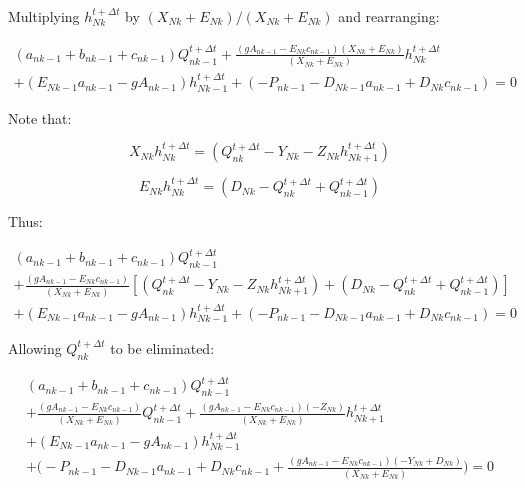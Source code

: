 \documentclass[11pt]{article}
\begin{document}
Multiplying $h_{Nk}^{t + \Delta t}$ by $(X_{Nk} + E_{Nk}) / (X_{Nk} + E_{Nk})$
and rearranging:

\begin{equation}
  \begin{split}
    (a_{nk - 1} + b_{nk - 1} + c_{nk - 1})  Q_{nk - 1}^{t + \Delta t} + \frac{( g A_{nk - 1} - E_{Nk} c_{nk - 1} ) (X_{Nk} + E_{Nk}) }{(X_{Nk} + E_{Nk})} h_{Nk}^{t + \Delta t} \\ + (E_{Nk - 1} a_{nk - 1} - g A_{nk -1}) h_{Nk - 1}^{t + \Delta t}   
    + ( - P_{nk - 1} - D_{Nk - 1} a_{nk - 1}   + D_{Nk} c_{nk - 1} ) = 0 
  \end{split}
\end{equation}

Note that:

\begin{equation}
X_{Nk} h_{Nk}^{t + \Delta t} = (Q_{nk}^{t + \Delta t} - Y_{Nk} - Z_{Nk}
h_{Nk + 1}^{t + \Delta t})
\end{equation}

\begin{equation}
E_{Nk} h_{Nk}^{t + \Delta t} = (D_{Nk} -
Q_{nk}^{t + \Delta t} + Q_{nk - 1}^{t + \Delta t})
\end{equation}

Thus:

\begin{equation}
  \begin{split}
    (a_{nk - 1} + b_{nk - 1} + c_{nk - 1})  Q_{nk - 1}^{t + \Delta t} \\ + \frac{( g A_{nk - 1} - E_{Nk} c_{nk - 1} )}{(X_{Nk} + E_{Nk})} [(Q_{nk}^{t + \Delta t} - Y_{Nk} - Z_{Nk} h_{Nk + 1}^{t + \Delta t}) + (D_{Nk} - Q_{nk}^{t + \Delta t} + Q_{nk - 1}^{t + \Delta t})] \\ + (E_{Nk - 1} a_{nk - 1} - g A_{nk -1}) h_{Nk - 1}^{t + \Delta t}   
    + ( - P_{nk - 1} - D_{Nk - 1} a_{nk - 1}   + D_{Nk} c_{nk - 1} ) = 0 
  \end{split}
\end{equation}

Allowing $Q_{nk}^{t + \Delta t}$ to be eliminated:

\begin{equation}
  \begin{split}
    (a_{nk - 1} + b_{nk - 1} + c_{nk - 1})  Q_{nk - 1}^{t + \Delta t} \\ + \frac{( g A_{nk - 1} - E_{Nk} c_{nk - 1} )}{(X_{Nk} + E_{Nk})} Q_{nk - 1}^{t + \Delta t} + \frac{( g A_{nk - 1} - E_{Nk} c_{nk - 1} ) (-Z_{Nk})}{(X_{Nk} + E_{Nk})} h_{Nk + 1}^{t + \Delta t} \\ + (E_{Nk - 1} a_{nk - 1} - g A_{nk -1}) h_{Nk - 1}^{t + \Delta t}   
   \\ + \biggl( - P_{nk - 1} - D_{Nk - 1} a_{nk - 1}   + D_{Nk} c_{nk - 1} + \frac{( g A_{nk - 1} - E_{Nk} c_{nk - 1} )(-Y_{Nk} + D_{Nk})}{(X_{Nk} + E_{Nk})} \biggr) = 0 
  \end{split}
\end{equation}
\end{document}

